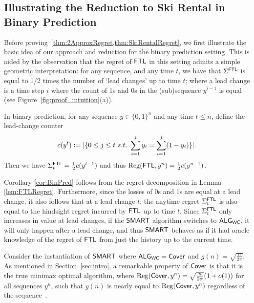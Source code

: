 \subsection{Illustrating the Reduction to Ski Rental in Binary Prediction}
\label{ssec:binary}

Before proving~\cref{thm:2ApproxRegret,thm:SkiRentalRegret}, we first illustrate the basic idea of our approach and reduction for the binary prediction setting. This is aided by the observation that the regret of $\mathsf{FTL}$ in this setting admits a simple geometric interpretation: for any sequence, and any time $t$, we have that $\Sigma^{\mathsf{FTL}}$ is equal to 1/2 times the number of `lead changes' up to time $t$; where a lead change is a time step $i$ where the count of $1$s and $0$s in the (sub)sequence $y^{i-1}$ is equal (see Figure~\ref{fig:proof_intuition}(a)). 
\begin{corollary} \label{cor:BinPred}
In binary prediction, for any sequence $y\in\{0,1\}^n$ and any time $t\leq n$, define the lead-change counter
\[
c(y^t) \mathrel{\mathop{:}}= |\{0 \le j \le t ~s.t.~ \sum_{i=1}^j y_i = \sum_{i=1}^j (1-y_i)\}|.
\]
Then we have $\Sigma^{\mathsf{FTL}}_t = \frac12 c(y^{t-1})$ and thus $\mathrm{Reg}(\mathsf{FTL}, y^n) = \frac12 c(y^{n-1})$. 
\end{corollary}

Corollary \ref{cor:BinPred} follows from the regret decomposition in Lemma \ref{lem:FTLRegret}. Furthermore, since the losses of 0s and 1s are equal at a lead change, it also follows that at a lead change $t$, the anytime regret $\Sigma^{\mathsf{FTL}}_t$ is also equal to the hindsight regret incurred by $\mathsf{FTL}$ up to time $t$. Since $\Sigma^{\mathsf{FTL}}_t$ only increases in value at lead changes, if the $\mathsf{SMART}$ algorithm switches to $\mathsf{ALG}_{\mathsf{WC}}$, it will only happen after a lead change, and thus $\mathsf{SMART}$ behaves as if it had oracle knowledge of the regret of $\mathsf{FTL}$ from just the history up to the current time.

Consider the instantiation of $\mathsf{SMART}$ where $\mathsf{ALG}_{\mathsf{WC}} = \mathsf{Cover}$ and $g(n) = \sqrt{\frac{n}{2 \pi}}$. As mentioned in Section~\ref{sec:intro}, a remarkable property of $\mathsf{Cover}$ is that it is the true minimax optimal algorithm, where $\mathrm{Reg}(\mathsf{Cover},y^n) = \sqrt{\frac{n}{2 \pi}} (1+o(1))$ for all sequences $y^n$, such that $g(n)$ is nearly equal to $\mathrm{Reg}(\mathsf{Cover},y^n)$ regardless of the sequence~\citep{Cover1966}. 

